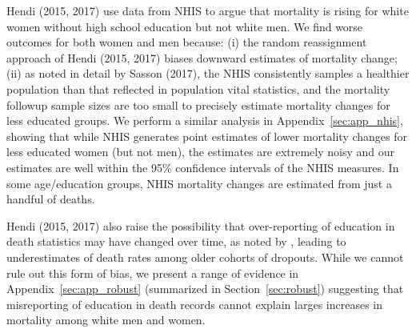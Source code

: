 Hendi (2015, 2017) use data from NHIS to argue that mortality is rising for white women without high school education but not white men. We find worse outcomes for both women and men because: (i) the random reassignment approach of Hendi (2015, 2017) biases downward estimates of mortality change; (ii) as noted in detail by Sasson (2017), the NHIS consistently samples a healthier population than that reflected in population vital statistics, and the mortality followup sample sizes are too small to precisely estimate mortality changes for less educated groups. We perform a similar analysis in Appendix~\ref{sec:app_nhis}, showing that while NHIS generates point estimates of lower mortality changes for less educated women (but not men), the estimates are extremely noisy and our estimates are well within the 95\% confidence intervals of the NHIS measures. In some age/education groups, NHIS mortality changes are estimated from just a handful of deaths.

Hendi (2015, 2017) also raise the possibility that over-reporting of education in death statistics may have changed over time, as noted by \citet{Sorlie1996}, leading to underestimates of death rates among older cohorts of dropouts. While we cannot rule out this form of bias, we present a range of evidence in Appendix~\ref{sec:app_robust} (summarized in Section~\ref{sec:robust}) suggesting that misreporting of education in death records cannot explain larges increases in mortality among white men and women.
